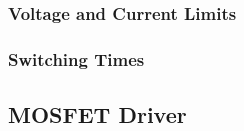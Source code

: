 


\subsubsection{Voltage and Current Limits}



\subsubsection{Switching Times}



\subsection{MOSFET Driver}





